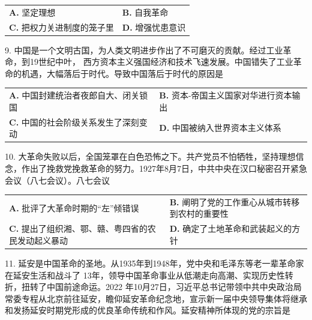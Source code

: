 \documentclass[UTF8,11pt]{ctexart}
\begin{document}
\begin{center}\begin{tabular}{>{\raggedright\arraybackslash}p{\dimexpr(\linewidth-4\tabcolsep)/2\relax}>{\raggedright\arraybackslash}p{\dimexpr(\linewidth-4\tabcolsep)/2\relax}}
\textbf{A.} 坚定理想 & \textbf{B.} 自我革命\\[.35em]
\textbf{C.} 把权力关进制度的笼子里 & \textbf{D.} 增强忧患意识\\[.35em]\end{tabular}\end{center}

9. 中国是一个文明古国，为人类文明进步作出了不可磨灭的贡献。经过工业革命，到19世纪中叶， 西方资本主义强国经济和技术飞速发展。中国错失了工业革命的机遇，大幅落后于时代。导致中国落后于时代的原因是


\begin{center}\begin{tabular}{>{\raggedright\arraybackslash}p{\dimexpr(\linewidth-4\tabcolsep)/2\relax}>{\raggedright\arraybackslash}p{\dimexpr(\linewidth-4\tabcolsep)/2\relax}}
\textbf{A.} 中国封建统治者夜郎自大、闭关锁国 & \textbf{B.} 资本-帝国主义国家对华进行资本输出\\[.35em]
\textbf{C.} 中国的社会阶级关系发生了深刻变动 & \textbf{D.} 中国被纳入世界资本主义体系\\[.35em]\end{tabular}\end{center}

10. 大革命失败以后，全国笼罩在白色恐怖之下。共产党员不怕牺牲，坚持理想信念，作出了挽救党挽救革命的努力。1927年8月7日，中共中央在汉口秘密召开紧急会议（八七会议）。八七会议


\begin{center}\begin{tabular}{>{\raggedright\arraybackslash}p{\dimexpr(\linewidth-4\tabcolsep)/2\relax}>{\raggedright\arraybackslash}p{\dimexpr(\linewidth-4\tabcolsep)/2\relax}}
\textbf{A.} 批评了大革命时期的“左”倾错误 & \textbf{B.} 阐明了党的工作重心从城市转移到农村的重要性\\[.35em]
\textbf{C.} 提出了组织湘、鄂、赣、粤四省的农民发动起义暴动 & \textbf{D.} 确定了土地革命和武装起义的方针\\[.35em]\end{tabular}\end{center}

11. 延安是中国革命的圣地。从1935年到1948年，党中央和毛泽东等老一辈革命家在延安生活和战斗了 13年，领导中国革命事业从低潮走向高潮、实现历史性转折，扭转了中国前途命运。2022 年10月27日，习近平总书记带领中共中央政治局常委专程从北京前往延安，瞻仰延安革命纪念地，宣示新一届中央领导集体将继承和发扬延安时期党形成的优良革命传统和作风。延安精神所体现的党的宗旨是
\end{document}
